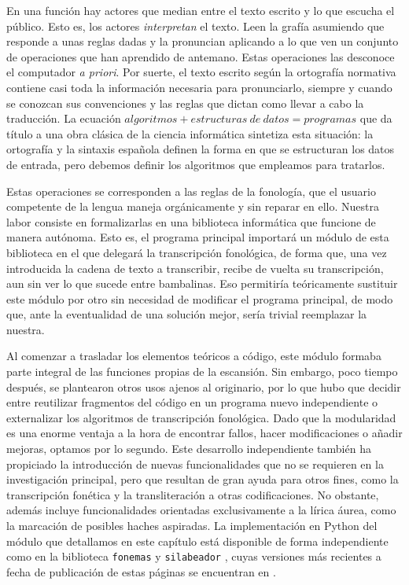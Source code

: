 En una función hay actores que median entre el texto escrito y lo que escucha el público. Esto es, los actores \textit{interpretan} el texto. Leen la grafía asumiendo que responde a unas reglas dadas y la pronuncian aplicando a lo que ven un conjunto de operaciones que han aprendido de antemano. Estas operaciones las desconoce el computador \textit{a priori}. Por suerte, el texto escrito según la ortografía normativa contiene casi toda la información necesaria para pronunciarlo, siempre y cuando se conozcan sus convenciones y las reglas que dictan como llevar a cabo la traducción. La ecuación $algoritmos + estructuras\: de\: datos = programas$ que da título a una obra clásica de la ciencia informática \parencite{wirth1976} sintetiza esta situación: la ortografía y la sintaxis española definen la forma en que se estructuran los datos de entrada, pero debemos definir los algoritmos que empleamos para tratarlos.

Estas operaciones se corresponden a las reglas de la fonología, que el usuario competente de la lengua maneja orgánicamente y sin reparar en ello. Nuestra labor consiste en formalizarlas en una biblioteca informática que funcione de manera autónoma. Esto es, el programa principal importará un módulo de esta biblioteca en el que delegará la transcripción fonológica, de forma que, una vez introducida la cadena de texto a transcribir, recibe de vuelta su transcripción, aun sin ver lo que sucede entre bambalinas. Eso permitiría teóricamente sustituir este módulo por otro sin necesidad de modificar el programa principal, de modo que, ante la eventualidad de una solución mejor, sería trivial reemplazar la nuestra.

Al comenzar a trasladar los elementos teóricos a código, este módulo formaba parte integral de las funciones propias de la escansión. Sin embargo, poco tiempo después, se plantearon otros usos ajenos al originario, por lo que hubo que decidir entre reutilizar fragmentos del código en un programa nuevo independiente o externalizar los algoritmos de transcripción fonológica. Dado que la modularidad es una enorme ventaja a la hora de encontrar fallos, hacer modificaciones o añadir mejoras, optamos por lo segundo. Este desarrollo independiente también ha propiciado la introducción de nuevas funcionalidades que no se requieren en la investigación principal, pero que resultan de gran ayuda para otros fines, como la transcripción fonética y la transliteración a otras codificaciones. No obstante, además incluye funcionalidades orientadas exclusivamente a la lírica áurea, como la marcación de posibles haches aspiradas. La implementación en Python del módulo que detallamos en este capítulo está disponible de forma independiente como en la biblioteca \texttt{fonemas} \parencite{sanz2021sa} y \texttt{silabeador} \parencite{sanz2021sb}, cuyas versiones más recientes a fecha de publicación de estas páginas se encuentran en .

